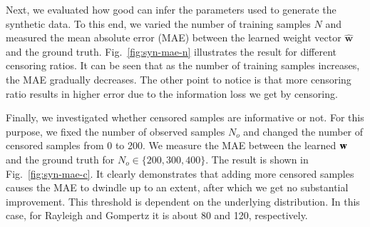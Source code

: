 Next, we evaluated how good \npglm can infer the parameters used to generate the synthetic data. To this end, we varied the number of training samples $N$ and measured the mean absolute error (MAE) between the learned weight vector $\hat{\mathbf{w}}$ and the ground truth. Fig.~\ref{fig:syn-mae-n} illustrates the result for different censoring ratios. It can be seen that as the number of training samples increases, the MAE gradually decreases. The other point to notice is that more censoring ratio results in higher error due to the information loss we get by censoring.



Finally, we investigated whether censored samples are informative or not. For this purpose, we fixed the number of observed samples $N_o$ and changed the number of censored samples from 0 to 200. We measure the MAE between the learned $\mathbf{w}$ and the ground truth for $N_o\in\{200,300,400\}$. The result is shown in Fig.~\ref{fig:syn-mae-c}. It clearly demonstrates that adding more censored samples causes the MAE to dwindle up to an extent, after which we get no substantial improvement. This threshold is dependent on the underlying distribution. In this case, for Rayleigh and Gompertz it is about 80 and 120, respectively.

